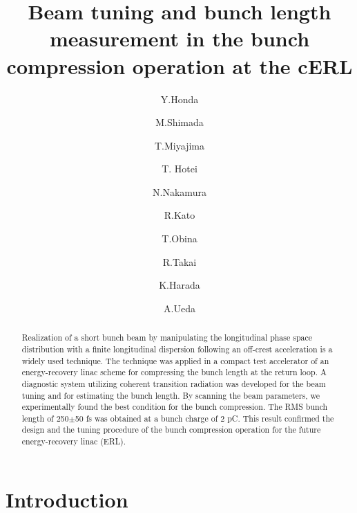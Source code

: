 \documentclass[review]{elsarticle}
\begin{document}
\begin{frontmatter}

\title{Beam tuning and bunch length measurement in the bunch compression operation at the cERL}

\author[kekadd,sokenadd]{Y.Honda}
\author[kekadd,sokenadd]{M.Shimada}
\author[kekadd,sokenadd]{T.Miyajima}
\author[sokenadd]{T. Hotei}
\author[kekadd,sokenadd]{N.Nakamura} 
\author[kekadd,sokenadd]{R.Kato}
\author[kekadd,sokenadd]{T.Obina}
\author[kekadd,sokenadd]{R.Takai}
\author[kekadd,sokenadd]{K.Harada}
\author[kekadd]{A.Ueda}


\address[kekadd]{High Energy Accelerator Research Organization (KEK), 1-1 Oho, Tsukuba, Ibaraki, Japan}

\address[sokenadd]{The Graduate University for Advanced Studies (SOKENDAI), 1-1 Oho, Tsukuba, Ibaraki, Japan}




\begin{abstract}
Realization of a short bunch beam 
by manipulating the longitudinal phase space distribution
with a finite longitudinal dispersion following an off-crest acceleration 
is a widely used technique.
The technique was applied in a compact test accelerator of an energy-recovery linac scheme
for compressing the bunch length at the return loop.
A diagnostic system utilizing coherent transition radiation 
was developed for the beam tuning and for estimating the bunch length.
By scanning the beam parameters,
we experimentally found the best condition for the bunch compression.
The RMS bunch length of 250$\pm$50 fs was obtained
at a bunch charge of 2 pC.
This result confirmed the design 
and the tuning procedure of the bunch compression operation for
the future energy-recovery linac (ERL).
\end{abstract}


\end{frontmatter}


\section{Introduction}
\end{document}
